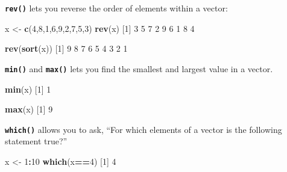 \documentclass[
]{book}
\newenvironment{Shaded}{\begin{snugshade}}{\end{snugshade}}
\newcommand{\DecValTok}[1]{\textcolor[rgb]{0.00,0.00,0.81}{#1}}
\newcommand{\KeywordTok}[1]{\textcolor[rgb]{0.13,0.29,0.53}{\textbf{#1}}}
\newcommand{\NormalTok}[1]{#1}
\newcommand{\OperatorTok}[1]{\textcolor[rgb]{0.81,0.36,0.00}{\textbf{#1}}}
\newcommand{\StringTok}[1]{\textcolor[rgb]{0.31,0.60,0.02}{#1}}
\begin{document}
\textbf{\texttt{rev()}} lets you reverse the order of elements within a vector:

\begin{Shaded}
\begin{Highlighting}[]
\NormalTok{x <-}\StringTok{ }\KeywordTok{c}\NormalTok{(}\DecValTok{4}\NormalTok{,}\DecValTok{8}\NormalTok{,}\DecValTok{1}\NormalTok{,}\DecValTok{6}\NormalTok{,}\DecValTok{9}\NormalTok{,}\DecValTok{2}\NormalTok{,}\DecValTok{7}\NormalTok{,}\DecValTok{5}\NormalTok{,}\DecValTok{3}\NormalTok{)}
\KeywordTok{rev}\NormalTok{(x)}
\NormalTok{[}\DecValTok{1}\NormalTok{] }\DecValTok{3} \DecValTok{5} \DecValTok{7} \DecValTok{2} \DecValTok{9} \DecValTok{6} \DecValTok{1} \DecValTok{8} \DecValTok{4}
\end{Highlighting}
\end{Shaded}

\begin{Shaded}
\begin{Highlighting}[]
\KeywordTok{rev}\NormalTok{(}\KeywordTok{sort}\NormalTok{(x))}
\NormalTok{[}\DecValTok{1}\NormalTok{] }\DecValTok{9} \DecValTok{8} \DecValTok{7} \DecValTok{6} \DecValTok{5} \DecValTok{4} \DecValTok{3} \DecValTok{2} \DecValTok{1}
\end{Highlighting}
\end{Shaded}

\textbf{\texttt{min()}} and \textbf{\texttt{max()}} lets you find the smallest and largest value in a vector.

\begin{Shaded}
\begin{Highlighting}[]
\KeywordTok{min}\NormalTok{(x)}
\NormalTok{[}\DecValTok{1}\NormalTok{] }\DecValTok{1}
\end{Highlighting}
\end{Shaded}

\begin{Shaded}
\begin{Highlighting}[]
\KeywordTok{max}\NormalTok{(x)}
\NormalTok{[}\DecValTok{1}\NormalTok{] }\DecValTok{9}
\end{Highlighting}
\end{Shaded}

\textbf{\texttt{which()}} allows you to ask, ``For which elements of a vector is the following statement true?''

\begin{Shaded}
\begin{Highlighting}[]
\NormalTok{x <-}\StringTok{ }\DecValTok{1}\OperatorTok{:}\DecValTok{10}
\KeywordTok{which}\NormalTok{(x}\OperatorTok{==}\DecValTok{4}\NormalTok{)}
\NormalTok{[}\DecValTok{1}\NormalTok{] }\DecValTok{4}
\end{Highlighting}
\end{Shaded}
\end{document}
